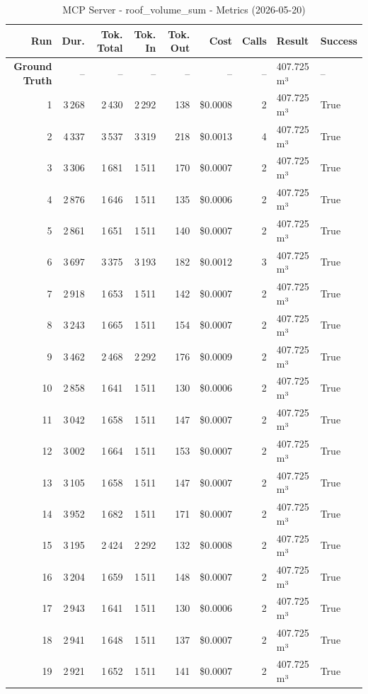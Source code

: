 \documentclass[a4paper,11pt]{article}
\begin{document}
\begin{table}[ht]
\centering
\scriptsize
\caption{MCP Server - roof\_volume\_sum - Metrics (2026-05-20)}
\label{tab:mcp\_roof\_volume\_sum\_metrics\_2026-05-20}
\begin{tabular}{r r r r r r r p{3cm} l}
\hline
Run & Dur. & Tok. Total & Tok. In & Tok. Out & Cost & Calls & Result & Success \\
\hline
\textbf{Ground Truth} & -- & -- & -- & -- & -- & -- & 407.725 m³ & -- \\
\hline
1 & 3\,268 & 2\,430 & 2\,292 & 138 & \$0.0008 & 2 & 407.725 m³ & True \\
2 & 4\,337 & 3\,537 & 3\,319 & 218 & \$0.0013 & 4 & 407.725 m³ & True \\
3 & 3\,306 & 1\,681 & 1\,511 & 170 & \$0.0007 & 2 & 407.725 m³ & True \\
4 & 2\,876 & 1\,646 & 1\,511 & 135 & \$0.0006 & 2 & 407.725 m³ & True \\
5 & 2\,861 & 1\,651 & 1\,511 & 140 & \$0.0007 & 2 & 407.725 m³ & True \\
6 & 3\,697 & 3\,375 & 3\,193 & 182 & \$0.0012 & 3 & 407.725 m³ & True \\
7 & 2\,918 & 1\,653 & 1\,511 & 142 & \$0.0007 & 2 & 407.725 m³ & True \\
8 & 3\,243 & 1\,665 & 1\,511 & 154 & \$0.0007 & 2 & 407.725 m³ & True \\
9 & 3\,462 & 2\,468 & 2\,292 & 176 & \$0.0009 & 2 & 407.725 m³ & True \\
10 & 2\,858 & 1\,641 & 1\,511 & 130 & \$0.0006 & 2 & 407.725 m³ & True \\
11 & 3\,042 & 1\,658 & 1\,511 & 147 & \$0.0007 & 2 & 407.725 m³ & True \\
12 & 3\,002 & 1\,664 & 1\,511 & 153 & \$0.0007 & 2 & 407.725 m³ & True \\
13 & 3\,105 & 1\,658 & 1\,511 & 147 & \$0.0007 & 2 & 407.725 m³ & True \\
14 & 3\,952 & 1\,682 & 1\,511 & 171 & \$0.0007 & 2 & 407.725 m³ & True \\
15 & 3\,195 & 2\,424 & 2\,292 & 132 & \$0.0008 & 2 & 407.725 m³ & True \\
16 & 3\,204 & 1\,659 & 1\,511 & 148 & \$0.0007 & 2 & 407.725 m³ & True \\
17 & 2\,943 & 1\,641 & 1\,511 & 130 & \$0.0006 & 2 & 407.725 m³ & True \\
18 & 2\,941 & 1\,648 & 1\,511 & 137 & \$0.0007 & 2 & 407.725 m³ & True \\
19 & 2\,921 & 1\,652 & 1\,511 & 141 & \$0.0007 & 2 & 407.725 m³ & True \\

\end{tabular}
\end{table}
\end{document}
